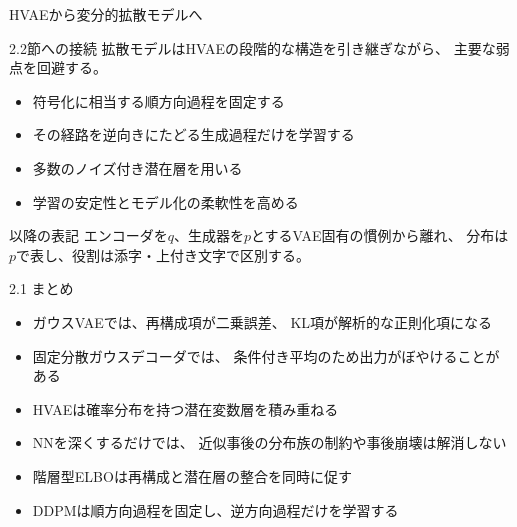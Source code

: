 \begin{frame}{HVAEから変分的拡散モデルへ}
    \begin{block}{2.2節への接続}
        拡散モデルはHVAEの段階的な構造を引き継ぎながら、
        主要な弱点を回避する。
    \end{block}
    \begin{itemize}
        \item 符号化に相当する順方向過程を固定する
        \item その経路を逆向きにたどる生成過程だけを学習する
        \item 多数のノイズ付き潜在層を用いる
        \item 学習の安定性とモデル化の柔軟性を高める
    \end{itemize}
    \begin{exampleblock}{以降の表記}
        エンコーダを$q$、生成器を$p$とするVAE固有の慣例から離れ、
        分布は$p$で表し、役割は添字・上付き文字で区別する。
    \end{exampleblock}
\end{frame}
\begin{frame}{2.1 まとめ}
    \begin{itemize}
        \item ガウスVAEでは、再構成項が二乗誤差、
        KL項が解析的な正則化項になる
        \item 固定分散ガウスデコーダでは、
        条件付き平均のため出力がぼやけることがある
        \item HVAEは確率分布を持つ潜在変数層を積み重ねる
        \item NNを深くするだけでは、
        近似事後の分布族の制約や事後崩壊は解消しない
        \item 階層型ELBOは再構成と潜在層の整合を同時に促す
        \item DDPMは順方向過程を固定し、逆方向過程だけを学習する
    \end{itemize}
\end{frame}
